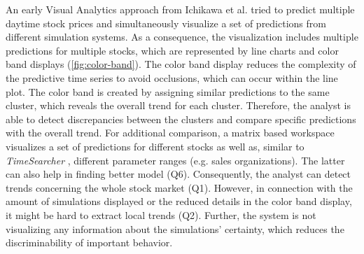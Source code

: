 \documentclass[electronic]{vgtc}             %
\begin{document}
An early Visual Analytics approach from Ichikawa et al. \cite{ichikawa:2002} tried to predict multiple daytime stock prices and simultaneously visualize a set of predictions from different simulation systems. 
As a consequence, the visualization includes multiple predictions for multiple stocks, which are represented by line charts and color band displays (\autoref{fig:color-band}).
The color band display reduces the complexity of the predictive time series to avoid occlusions, which can occur within the line plot. 
The color band is created by assigning similar predictions to the same cluster, which reveals the overall trend for each cluster.
Therefore, the analyst is able to detect discrepancies between the clusters and compare specific predictions with the overall trend. 
For additional comparison, a matrix based workspace visualizes a set of predictions for different stocks as well as, similar to \textit{TimeSearcher} \cite{buono:2007}, different parameter ranges (e.g. sales organizations). 
The latter can also help in finding better model (Q6).
Consequently, the analyst can detect trends concerning the whole stock market (Q1).  
However, in connection with the amount of simulations displayed or the reduced details in the color band display, it might be hard to extract local trends (Q2).
Further, the system is not visualizing any information about the simulations' certainty, which reduces the discriminability of important behavior. 
\end{document}
